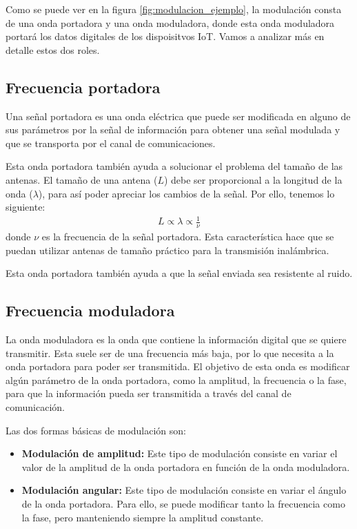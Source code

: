 \documentclass[12pt, letterpaper]{article}
\begin{document}
Como se puede ver en la figura \ref{fig:modulacion_ejemplo}, la modulación consta de una onda portadora y una onda moduladora, donde esta onda moduladora portará los datos digitales de los dispoisitvos IoT. Vamos a analizar más en detalle estos dos roles.

\subsection{Frecuencia portadora}
Una señal portadora es una onda eléctrica que puede ser modificada en alguno de sus parámetros por la señal de información para obtener una señal modulada y que se transporta por el canal de comunicaciones. 

Esta onda portadora también ayuda a solucionar el problema del tamaño de las antenas. El tamaño de una antena ($L$) debe ser proporcional a la longitud de la onda ($\lambda$), para así poder apreciar los cambios de la señal. Por ello, tenemos lo siguiente:
\begin{align}
    L \propto \lambda \propto \frac{1}{\nu}
\end{align}
donde $\nu$ es la frecuencia de la señal portadora. Esta característica hace que se puedan utilizar antenas de tamaño práctico para la transmisión inalámbrica.

Esta onda portadora también ayuda a que la señal enviada sea resistente al ruido.

\subsection{Frecuencia moduladora}
La onda moduladora es la onda que contiene la información digital que se quiere transmitir. Esta suele ser de una frecuencia más baja, por lo que necesita a la onda portadora para poder ser transmitida. El objetivo de esta onda es modificar algún parámetro de la onda portadora, como la amplitud, la frecuencia o la fase, para que la información pueda ser transmitida a través del canal de comunicación.

Las dos formas básicas de modulación son:
\begin{itemize}
    \item \textbf{Modulación de amplitud:} Este tipo de modulación consiste en variar el valor de la amplitud de la onda portadora en función de la onda moduladora. 

    \item \textbf{Modulación angular:} Este tipo de modulación consiste en variar el ángulo de la onda portadora. Para ello, se puede modificar tanto la frecuencia como la fase, pero manteniendo siempre la amplitud constante.
\end{itemize}
\end{document}
